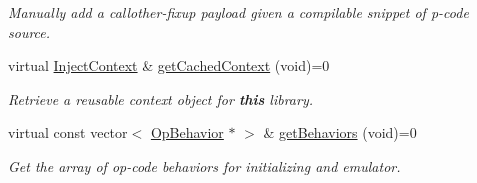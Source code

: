 \begin{DoxyCompactItemize}
\begin{DoxyCompactList}\small\item\em Manually add a callother-\/fixup payload given a compilable snippet of p-\/code {\itshape source}. \end{DoxyCompactList}\item 
virtual \mbox{\hyperlink{class_inject_context}{Inject\+Context}} \& \mbox{\hyperlink{class_pcode_inject_library_a3a1ca9f7ea2cea02de1141cc35c79b18}{get\+Cached\+Context}} (void)=0
\begin{DoxyCompactList}\small\item\em Retrieve a reusable context object for {\bfseries{this}} library. \end{DoxyCompactList}\item 
virtual const vector$<$ \mbox{\hyperlink{class_op_behavior}{Op\+Behavior}} $\ast$ $>$ \& \mbox{\hyperlink{class_pcode_inject_library_aa2c520dab5db72d968e383b56d1ea8f6}{get\+Behaviors}} (void)=0
\begin{DoxyCompactList}\small\item\em Get the array of op-\/code behaviors for initializing and emulator. \end{DoxyCompactList}\end{DoxyCompactItemize}
